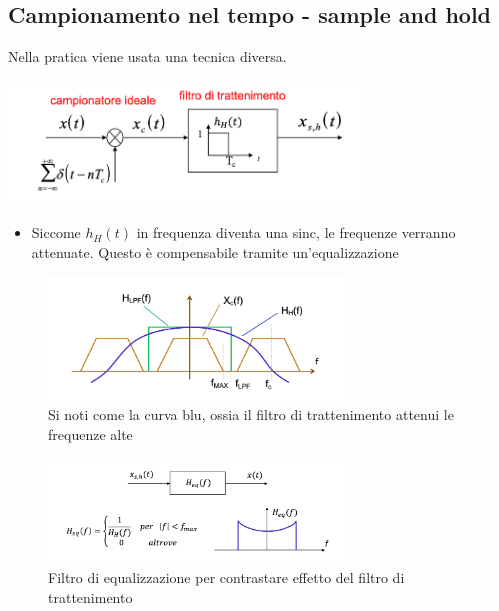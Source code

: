 \subsection{Campionamento nel tempo - sample and hold}
Nella pratica viene usata una tecnica diversa.
\begin{center}
	\includegraphics[width = 0.7\textwidth]{Images/Sample and hold.png }
\end{center}
\begin{itemize}
	\item Siccome $ h_H\left(t\right) $ in frequenza diventa una sinc, le frequenze verranno attenuate. Questo è compensabile tramite un'equalizzazione
\end{itemize}
\begin{figure}
	\begin{center}
		\includegraphics[width = 0.7\textwidth]{Images/Sample and hold 2.png}
	\end{center}
	\caption{Si noti come la curva blu, ossia il filtro di trattenimento attenui le frequenze alte}
\end{figure}
\begin{figure}
	\begin{center}
		\includegraphics[width = 0.7\textwidth]{Images/Sample and hold 3.png}
	\end{center}
	\caption{Filtro di equalizzazione per contrastare effetto del filtro di trattenimento}
\end{figure}
